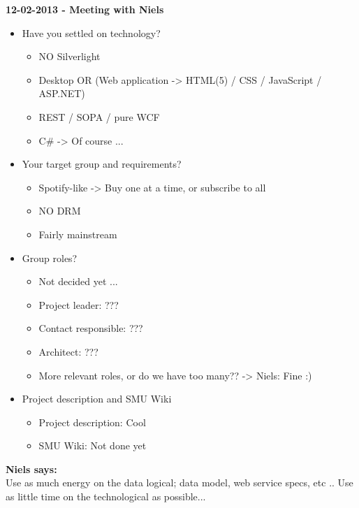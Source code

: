 \documentclass[11pt]{article}
\begin{document}
\begin{landscape}
\begin{multicols}{2}
\textbf{12-02-2013 - Meeting with Niels}
\begin{itemize}
\item Have you settled on technology?
\begin{itemize}
\item NO Silverlight
\item Desktop OR (Web application -> HTML(5) / CSS / JavaScript / ASP.NET)
\item REST / SOPA / pure WCF
\item C\# -> Of course ...
\end{itemize}
\item Your target group and requirements?
\begin{itemize}
\item Spotify-like -> Buy one at a time, or subscribe to all
\item NO DRM
\item Fairly mainstream
\end{itemize}
\item Group roles?
\begin{itemize}
\item Not decided yet ...
\item Project leader: ???
\item Contact responsible: ???
\item Architect: ???
\item More relevant roles, or do we have too many?? -> Niels: Fine :)
\end{itemize}
\item Project description and SMU Wiki
\begin{itemize}
\item Project description: Cool
\item SMU Wiki: Not done yet
\end{itemize}
\end{itemize}

\textbf{Niels says:} \\
Use as much energy on the data logical; data model, web service specs, etc .. Use as little time on the technological as possible... \\


\end{multicols}
\end{landscape}
\end{document}
